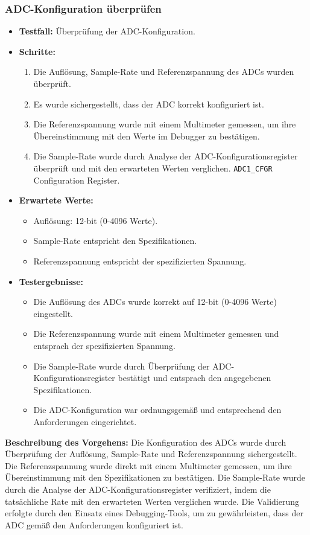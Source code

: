 \subsubsection{ADC-Konfiguration überprüfen}
\begin{itemize}
	\item \textbf{Testfall:} Überprüfung der ADC-Konfiguration.
	\item \textbf{Schritte:}
	\begin{enumerate}
		\item Die Auflösung, Sample-Rate und Referenzspannung des ADCs wurden überprüft.
		\item Es wurde sichergestellt, dass der ADC korrekt konfiguriert ist.
		\item Die Referenzspannung wurde mit einem Multimeter gemessen, um ihre Übereinstimmung mit den Werte im Debugger zu bestätigen.
		\item Die Sample-Rate wurde durch Analyse der ADC-Konfigurationsregister überprüft und mit den erwarteten Werten verglichen. \texttt{ADC1\_CFGR} Configuration Register.
	\end{enumerate}
	\item \textbf{Erwartete Werte:}
	\begin{itemize}
		\item Auflösung: 12-bit (0-4096 Werte).
		\item Sample-Rate entspricht den Spezifikationen.
		\item Referenzspannung entspricht der spezifizierten Spannung.
	\end{itemize}
	\item \textbf{Testergebnisse:}
	\begin{itemize}
		\item Die Auflösung des ADCs wurde korrekt auf 12-bit (0-4096 Werte) eingestellt.
		\item Die Referenzspannung wurde mit einem Multimeter gemessen und entsprach der spezifizierten Spannung.
		\item Die Sample-Rate wurde durch Überprüfung der ADC-Konfigurationsregister bestätigt und entsprach den angegebenen Spezifikationen.
		\item Die ADC-Konfiguration war ordnungsgemäß und entsprechend den Anforderungen eingerichtet.
	\end{itemize}
\end{itemize}

\textbf{Beschreibung des Vorgehens:}
Die Konfiguration des ADCs wurde durch Überprüfung der Auflösung, Sample-Rate und Referenzspannung sichergestellt. Die Referenzspannung wurde direkt mit einem Multimeter gemessen, um ihre Übereinstimmung mit den Spezifikationen zu bestätigen. Die Sample-Rate wurde durch die Analyse der ADC-Konfigurationsregister verifiziert, indem die tatsächliche Rate mit den erwarteten Werten verglichen wurde. Die Validierung erfolgte durch den Einsatz eines Debugging-Tools, um zu gewährleisten, dass der ADC gemäß den Anforderungen konfiguriert ist.


